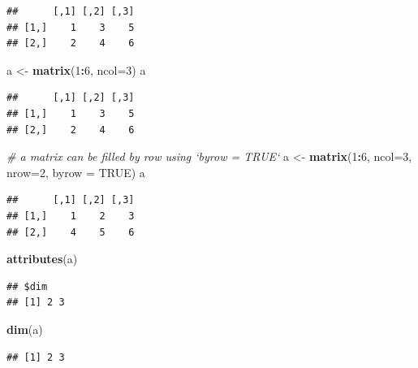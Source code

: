\documentclass[]{book}
\newenvironment{Shaded}{\begin{snugshade}}{\end{snugshade}}
\newcommand{\CommentTok}[1]{\textcolor[rgb]{0.56,0.35,0.01}{\textit{#1}}}
\newcommand{\DataTypeTok}[1]{\textcolor[rgb]{0.13,0.29,0.53}{#1}}
\newcommand{\DecValTok}[1]{\textcolor[rgb]{0.00,0.00,0.81}{#1}}
\newcommand{\KeywordTok}[1]{\textcolor[rgb]{0.13,0.29,0.53}{\textbf{#1}}}
\newcommand{\NormalTok}[1]{#1}
\newcommand{\OperatorTok}[1]{\textcolor[rgb]{0.81,0.36,0.00}{\textbf{#1}}}
\newcommand{\OtherTok}[1]{\textcolor[rgb]{0.56,0.35,0.01}{#1}}
\newcommand{\StringTok}[1]{\textcolor[rgb]{0.31,0.60,0.02}{#1}}
\begin{document}
\begin{verbatim}
##      [,1] [,2] [,3]
## [1,]    1    3    5
## [2,]    2    4    6
\end{verbatim}

\begin{Shaded}
\begin{Highlighting}[]
\NormalTok{a <-}\StringTok{ }\KeywordTok{matrix}\NormalTok{(}\DecValTok{1}\OperatorTok{:}\DecValTok{6}\NormalTok{, }\DataTypeTok{ncol=}\DecValTok{3}\NormalTok{)}
\NormalTok{a}
\end{Highlighting}
\end{Shaded}

\begin{verbatim}
##      [,1] [,2] [,3]
## [1,]    1    3    5
## [2,]    2    4    6
\end{verbatim}

\begin{Shaded}
\begin{Highlighting}[]
\CommentTok{# a matrix can be filled by row using `byrow = TRUE`}
\NormalTok{a <-}\StringTok{ }\KeywordTok{matrix}\NormalTok{(}\DecValTok{1}\OperatorTok{:}\DecValTok{6}\NormalTok{, }\DataTypeTok{ncol=}\DecValTok{3}\NormalTok{, }\DataTypeTok{nrow=}\DecValTok{2}\NormalTok{, }\DataTypeTok{byrow =} \OtherTok{TRUE}\NormalTok{)}
\NormalTok{a}
\end{Highlighting}
\end{Shaded}

\begin{verbatim}
##      [,1] [,2] [,3]
## [1,]    1    2    3
## [2,]    4    5    6
\end{verbatim}

\begin{Shaded}
\begin{Highlighting}[]
\KeywordTok{attributes}\NormalTok{(a)}
\end{Highlighting}
\end{Shaded}

\begin{verbatim}
## $dim
## [1] 2 3
\end{verbatim}

\begin{Shaded}
\begin{Highlighting}[]
\KeywordTok{dim}\NormalTok{(a)}
\end{Highlighting}
\end{Shaded}

\begin{verbatim}
## [1] 2 3
\end{verbatim}
\end{document}
